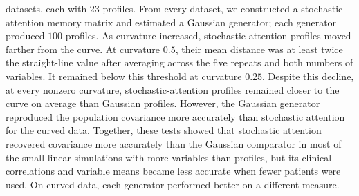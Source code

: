 {datasets, each with $23$ profiles. From every dataset, we constructed a stochastic-attention
memory matrix and estimated a Gaussian generator; each generator produced $100$ profiles. As
curvature increased, stochastic-attention profiles moved farther from the curve. At curvature
$0.5$, their mean distance was at least twice the straight-line value after averaging across
the five repeats and both numbers of variables. It remained below this threshold at curvature
$0.25$. Despite this decline, at every nonzero curvature, stochastic-attention profiles
remained closer to the curve on average than Gaussian profiles. However, the Gaussian
generator reproduced the population covariance more accurately than stochastic attention for
the curved data. Together, these tests showed that stochastic attention recovered covariance more accurately than the Gaussian
comparator in most of the small linear simulations with more variables than profiles, but its
clinical correlations and variable means became less accurate when fewer patients were used.
On curved data, each generator performed better on a different measure.}

\subsection{}


